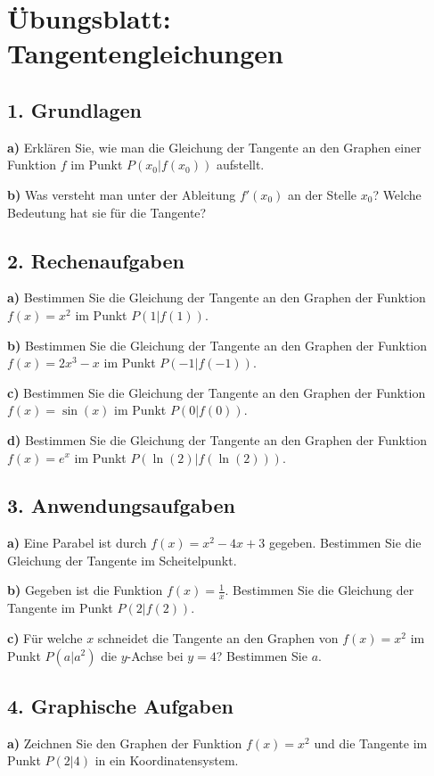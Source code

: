 
\section*{Übungsblatt: Tangentengleichungen}

\subsection*{1. Grundlagen}
\textbf{a)} Erklären Sie, wie man die Gleichung der Tangente an den Graphen einer Funktion $f$ im Punkt $P(x_0|f(x_0))$ aufstellt.

\textbf{b)} Was versteht man unter der Ableitung $f'(x_0)$ an der Stelle $x_0$? Welche Bedeutung hat sie für die Tangente?

\subsection*{2. Rechenaufgaben}
\textbf{a)} Bestimmen Sie die Gleichung der Tangente an den Graphen der Funktion $f(x) = x^2$ im Punkt $P(1|f(1))$.

\textbf{b)} Bestimmen Sie die Gleichung der Tangente an den Graphen der Funktion $f(x) = 2x^3 - x$ im Punkt $P(-1|f(-1))$.

\textbf{c)} Bestimmen Sie die Gleichung der Tangente an den Graphen der Funktion $f(x) = \sin(x)$ im Punkt $P(0|f(0))$.

\textbf{d)} Bestimmen Sie die Gleichung der Tangente an den Graphen der Funktion $f(x) = e^x$ im Punkt $P(\ln(2)|f(\ln(2)))$.

\subsection*{3. Anwendungsaufgaben}
\textbf{a)} Eine Parabel ist durch $f(x) = x^2 - 4x + 3$ gegeben. Bestimmen Sie die Gleichung der Tangente im Scheitelpunkt.

\textbf{b)} Gegeben ist die Funktion $f(x) = \frac{1}{x}$. Bestimmen Sie die Gleichung der Tangente im Punkt $P(2|f(2))$.

\textbf{c)} Für welche $x$ schneidet die Tangente an den Graphen von $f(x) = x^2$ im Punkt $P(a|a^2)$ die $y$-Achse bei $y = 4$? Bestimmen Sie $a$.

\subsection*{4. Graphische Aufgaben}
\textbf{a)} Zeichnen Sie den Graphen der Funktion $f(x) = x^2$ und die Tangente im Punkt $P(2|4)$ in ein Koordinatensystem.

